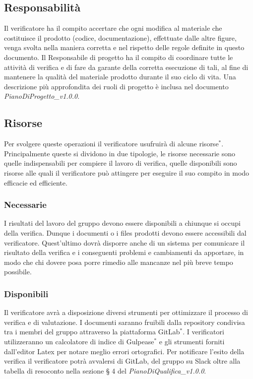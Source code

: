\subsection{Responsabilità}
Il verificatore ha il compito accertare che ogni modifica al materiale che costituisce il prodotto (codice, documentazione), effettuate dalle altre figure, venga svolta nella maniera corretta e nel rispetto delle regole definite in questo documento. Il Responsabile di progetto ha il compito di coordinare tutte le attività di verifica e di fare da garante della corretta esecuzione di tali, al fine di mantenere la qualità del materiale prodotto durante il suo ciclo di vita. Una descrizione più approfondita dei ruoli di progetto è inclusa nel documento  \textit{PianoDiProgetto\_v1.0.0}.

\subsection{Risorse}
Per svolgere queste operazioni il verificatore usufruirà di alcune risorse$^*$. Principalmente queste si dividono in due tipologie, le risorse necessarie sono quelle indispensabili per compiere il lavoro di verifica, quelle disponibili sono risorse alle quali il verificatore può attingere per eseguire il suo compito in modo efficacie ed efficiente.

\subsubsection{Necessarie}
I risultati del lavoro del gruppo devono essere disponibili a chiunque si occupi della verifica. Dunque i documenti o i files prodotti devono essere accessibili dal verificatore. Quest'ultimo dovrà disporre anche di un sistema per comunicare il risultato della verifica e i conseguenti problemi e cambiamenti da apportare, in modo che chi dovere posa porre rimedio alle mancanze nel più breve tempo possibile.

\subsubsection{Disponibili}
Il verificatore avrà a disposizione diversi strumenti per ottimizzare il processo di verifica e di valutazione. I documenti saranno fruibili dalla repository condivisa tra i membri del gruppo attraverso la piattaforma GitLab$^*$. I verificatori utilizzeranno un calcolatore di indice di Gulpease$^*$ e gli strumenti forniti dall'editor Latex per notare meglio errori ortografici. Per notificare l'esito della verifica il verificatore potrà avvalersi di GitLab, del gruppo su Slack oltre alla tabella di resoconto nella sezione § 4 del \textit{PianoDiQualifica\_v1.0.0}.

